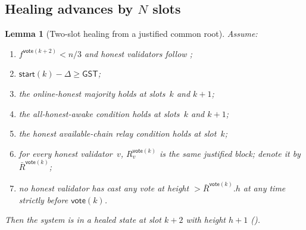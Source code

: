 \documentclass{article}
\newcommand{\start}{\mathsf{start}}
\newcommand{\vote}{\mathsf{vote}}
\newcommand{\comm}[1]{\bar{#1}}
\newcommand{\getConfirmed}{\textsf{getConfirmed}\xspace}
\theoremstyle{plain}
\newtheorem{lemma}{Lemma}
\theoremstyle{definition}
\theoremstyle{remark}
\newcommand{\GST}{\ensuremath{\mathsf{GST}}}
\newcommand{\OHM}{online-honest majority\xspace}
\newcommand{\HAR}{honest available-chain relay\xspace}
\newcommand{\AHA}{all-honest-awake\xspace}
\begin{document}
\subsection{Healing advances by $N$ slots}\label{rev:sec:healing-advances}


\begin{lemma}[Two-slot healing from a justified common root]\label{rev:lem:healing-from-justified}
Assume:
\begin{enumerate}
  \item\label{rev:hfj:f} $f^{\vote(k+2)} < n/3$ and honest validators follow ;
  \item\label{rev:hfj:sync} $\start(k) - \Delta \geq \GST$;
  \item\label{rev:hfj:ohm} the \OHM holds at slots~$k$ and $k+1$;
  \item\label{rev:hfj:aha} the \AHA condition holds at slots~$k$ and $k+1$;
  \item\label{rev:hfj:har} the \HAR condition holds at slot~$k$;
  \item\label{rev:hfj:r} for every honest validator~$v$, $R_v^{\vote(k)}$ is the same justified block; denote it by $\comm{R}^{\vote(k)}$;
  \item\label{rev:hfj:nh} no honest validator has cast any vote at height $> \comm{R}^{\vote(k)}.h$ at any time strictly before $\vote(k)$.
\end{enumerate}
Then the system is in a healed state at slot $k+2$ with height $h+1$ ().
\end{lemma}
\end{document}
